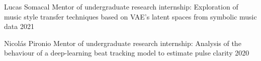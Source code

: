 


\begin{mentorships}

    \mentorship
    {Lucas Somacal}
    {Mentor of undergraduate research internship: Exploration of music
style transfer techniques based on VAE's latent spaces from symbolic music data}
    {2021}

    \mentorship
    {Nicolás Pironio}
    {Mentor of undergraduate research internship: Analysis of the
    behaviour of a deep-learning beat tracking model to estimate pulse clarity}
    {2020}

\end{mentorships}
